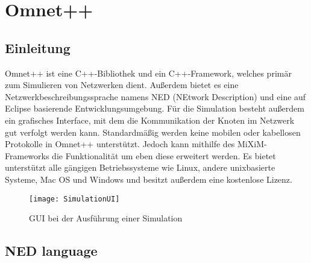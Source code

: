 \section{Omnet++}

\subsection{Einleitung}

Omnet++\cite{omnet} ist eine C++-Bibliothek und ein C++-Framework, welches primär zum Simulieren von Netzwerken dient. Außerdem bietet es eine Netzwerkbeschreibungssprache namens NED (NEtwork Description) und eine auf Eclipse\cite{eclipse} basierende Entwicklungsumgebung. Für die Simulation besteht außerdem ein grafisches Interface, mit dem die Kommunikation der Knoten im Netzwerk gut verfolgt werden kann.
\newline Standardmäßig werden keine mobilen oder kabellosen Protokolle in Omnet++ unterstützt. Jedoch kann mithilfe des MiXiM-Frameworks die Funktionalität um eben diese erweitert werden.
\newline Es bietet unterstützt alle gängigen Betriebssysteme wie Linux, andere unixbasierte Systeme, Mac OS und Windows und besitzt außerdem eine kostenlose Lizenz.

\begin{figure}[htbp]
\centering
\caption{GUI bei der Ausführung einer Simulation }
\label{fig:messageEvent}
\texttt{[image: SimulationUI]}
\end{figure}

\subsection{NED language}

